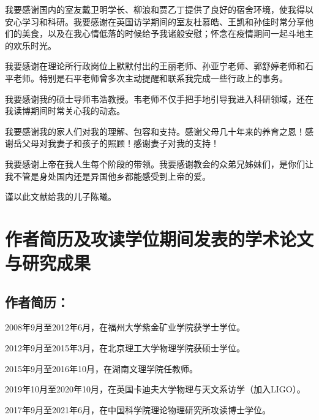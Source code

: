 我要感谢国内的室友戴卫明学长、柳浪和贾乙丁提供了良好的宿舍环境，使我得以安心学习和科研。我要感谢在英国访学期间的室友杜慕皓、王凯和孙佳时常分享他们的美食，以及在我心情低落的时候给予我诸般安慰；怀念在疫情期间一起斗地主的欢乐时光。

我要感谢在理论所行政岗位上默默付出的王丽老师、孙亚宁老师、郭舒婷老师和石平老师。特别是石平老师曾多次主动提醒和联系我完成一些行政上的事务。

我要感谢我的硕士导师韦浩教授。韦老师不仅手把手地引导我进入科研领域，还在我读博期间时常关心我的动态。

我要感谢我的家人们对我的理解、包容和支持。感谢父母几十年来的养育之恩！感谢岳父母对我妻子和孩子的照顾！感谢妻子对我的支持！

我要感谢上帝在我人生每个阶段的带领。我要感谢教会的众弟兄姊妹们，是你们让我不管是身处国内还是异国他乡都能感受到上帝的爱。

谨以此文献给我的儿子陈曦。


\chapter{作者简历及攻读学位期间发表的学术论文与研究成果}

\section*{作者简历：}

2008年9月至2012年6月，在福州大学紫金矿业学院获学士学位。

2012年9月至2015年3月，在北京理工大学物理学院获硕士学位。

2015年9月至2016年10月，在湖南文理学院任教师。

2019年10月至2020年10月，在英国卡迪夫大学物理与天文系访学（加入LIGO）。

2017年9月至2021年6月，在中国科学院理论物理研究所攻读博士学位。

